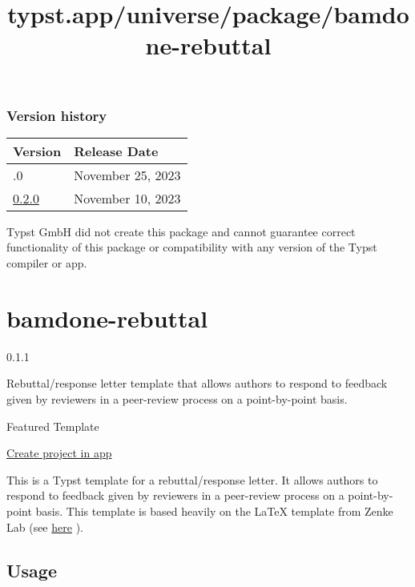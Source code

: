 \label{versions}
\subsubsection{Version history}\label{version-history}

\begin{longtable}[]{@{}ll@{}}
\toprule\noalign{}
Version & Release Date \\
\midrule\noalign{}
\endhead
\bottomrule\noalign{}
\endlastfoot
0.3.0 & November 25, 2023 \\
\href{https://typst.app/universe/package/cades/0.2.0/}{0.2.0} & November
10, 2023 \\
\end{longtable}

Typst GmbH did not create this package and cannot guarantee correct
functionality of this package or compatibility with any version of the
Typst compiler or app.


\title{typst.app/universe/package/bamdone-rebuttal}

\label{banner}
\label{template-thumbnail}

\section{bamdone-rebuttal}\label{bamdone-rebuttal}

{ 0.1.1 }

Rebuttal/response letter template that allows authors to respond to
feedback given by reviewers in a peer-review process on a point-by-point
basis.

{ } Featured Template

\href{/app?template=bamdone-rebuttal&version=0.1.1}{Create project in
app}

\label{readme}
This is a Typst template for a rebuttal/response letter. It allows
authors to respond to feedback given by reviewers in a peer-review
process on a point-by-point basis. This template is based heavily on the
LaTeX template from Zenke Lab (see
\href{https://zenkelab.org/resources/latex-rebuttal-response-to-reviewers-template/}{here}
).

\subsection{Usage}\label{usage}

